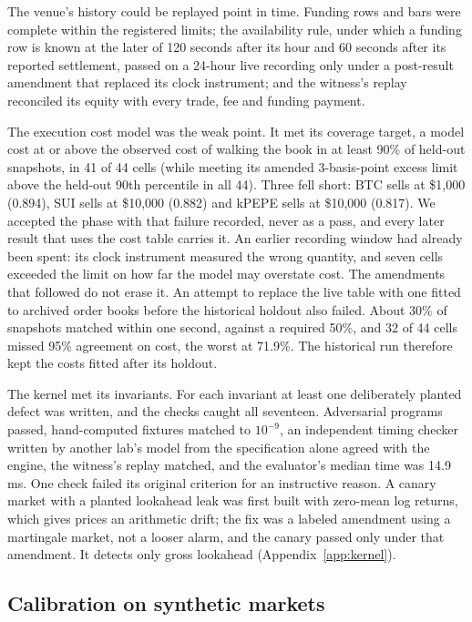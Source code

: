 \documentclass[11pt]{article}
\begin{document}
The venue's history could be replayed point in time. Funding rows and bars were complete within the registered limits; the availability rule, under which a funding row is known at the later of 120 seconds after its hour and 60 seconds after its reported settlement, passed on a 24-hour live recording only under a post-result amendment that replaced its clock instrument; and the witness's replay reconciled its equity with every trade, fee and funding payment.

The execution cost model was the weak point. It met its coverage target, a model cost at or above the observed cost of walking the book in at least 90\% of held-out snapshots, in 41 of 44 cells (while meeting its amended 3-basis-point excess limit above the held-out 90th percentile in all 44). Three fell short: BTC sells at \$1{,}000 (0.894), SUI sells at \$10{,}000 (0.882) and kPEPE sells at \$10{,}000 (0.817). We accepted the phase with that failure recorded, never as a pass, and every later result that uses the cost table carries it. An earlier recording window had already been spent: its clock instrument measured the wrong quantity, and seven cells exceeded the limit on how far the model may overstate cost. The amendments that followed do not erase it. An attempt to replace the live table with one fitted to archived order books before the historical holdout also failed. About 30\% of snapshots matched within one second, against a required 50\%, and 32 of 44 cells missed 95\% agreement on cost, the worst at 71.9\%. The historical run therefore kept the costs fitted after its holdout.

The kernel met its invariants. For each invariant at least one deliberately planted defect was written, and the checks caught all seventeen. Adversarial programs passed, hand-computed fixtures matched to $10^{-9}$, an independent timing checker written by another lab's model from the specification alone agreed with the engine, the witness's replay matched, and the evaluator's median time was 14.9\,ms. One check failed its original criterion for an instructive reason. A canary market with a planted lookahead leak was first built with zero-mean log returns, which gives prices an arithmetic drift; the fix was a labeled amendment using a martingale market, not a looser alarm, and the canary passed only under that amendment. It detects only gross lookahead (Appendix~\ref{app:kernel}).

\subsection{Calibration on synthetic markets}\label{sec:calibration}
\end{document}

